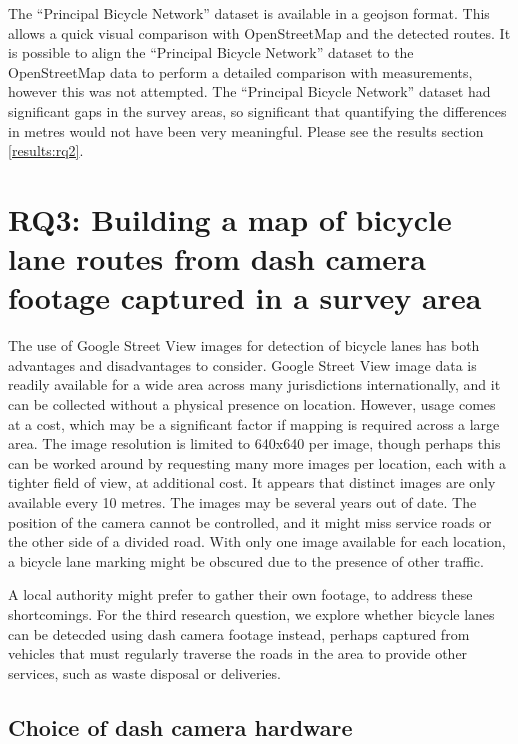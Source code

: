 \documentclass[11pt,twoside]{report}
\begin{document}
The ``Principal Bicycle Network'' dataset is available in a geojson format.  This allows a quick visual comparison with OpenStreetMap and the detected routes.  It is possible to align the ``Principal Bicycle Network'' dataset to the OpenStreetMap data to perform a detailed comparison with measurements, however this was not attempted.  The ``Principal Bicycle Network'' dataset had significant gaps in the survey areas, so significant that quantifying the differences in metres would not have been very meaningful.  Please see the results section \ref{results:rq2}.



\section{RQ3: Building a map of bicycle lane routes from dash camera footage captured in a survey area}
\label{s:rq3}

The use of Google Street View images for detection of bicycle lanes has both advantages and disadvantages to consider.  Google Street View image data is readily available for a wide area across many jurisdictions internationally, and it can be collected without a physical presence on location.  However, usage comes at a cost, which may be a significant factor if mapping is required across a large area.  The image resolution is limited to 640x640 per image, though perhaps this can be worked around by requesting many more images per location, each with a tighter field of view, at additional cost.  It appears that distinct images are only available every 10 metres.  The images may be several years out of date.  The position of the camera cannot be controlled, and it might miss service roads or the other side of a divided road.  With only one image available for each location, a bicycle lane marking might be obscured due to the presence of other traffic.

A local authority might prefer to gather their own footage, to address these shortcomings.  For the third research question, we explore whether bicycle lanes can be detecded using dash camera footage instead, perhaps captured from vehicles that must regularly traverse the roads in the area to provide other services, such as waste disposal or deliveries.


\subsection{Choice of dash camera hardware}
\label{s:rq3a}
\end{document}
